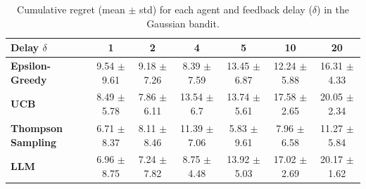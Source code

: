 \begin{table}[htbp]
\caption{Cumulative regret (mean $\pm$ std) for each agent and feedback delay ($\delta$) in the Gaussian bandit.}
\label{tab:gaussian_delays}
\begin{tabular}{lcccccc}
\toprule
Delay $\delta$ & 1 & 2 & 4 & 5 & 10 & 20 \\
\midrule
\textbf{Epsilon-Greedy} & 9.54 $\pm$ 9.61 & 9.18 $\pm$ 7.26 & 8.39 $\pm$ 7.59 & 13.45 $\pm$ 6.87 & 12.24 $\pm$ 5.88 & 16.31 $\pm$ 4.33 \\
\textbf{UCB} & 8.49 $\pm$ 5.78 & 7.86 $\pm$ 6.11 & 13.54 $\pm$ 6.7 & 13.74 $\pm$ 5.61 & 17.58 $\pm$ 2.65 & 20.05 $\pm$ 2.34 \\
\textbf{Thompson Sampling} & 6.71 $\pm$ 8.37 & 8.11 $\pm$ 8.46 & 11.39 $\pm$ 7.06 & 5.83 $\pm$ 9.61 & 7.96 $\pm$ 6.58 & 11.27 $\pm$ 5.84 \\
\textbf{LLM} & 6.96 $\pm$ 8.75 & 7.24 $\pm$ 7.82 & 8.75 $\pm$ 4.48 & 13.92 $\pm$ 5.03 & 17.02 $\pm$ 2.69 & 20.17 $\pm$ 1.62 \\
\bottomrule
\end{tabular}
\end{table}
